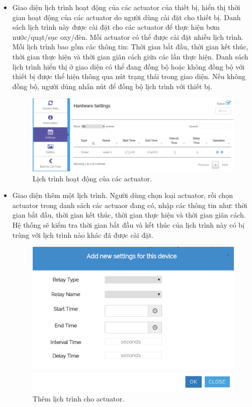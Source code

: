 \documentclass[a4paper,12pt,oneside]{article}
\begin{document}
\begin{itemize}
\item Giao diện lịch trình hoạt động của các actuator của thiết bị, hiển thị thời gian hoạt động của các actuator do người dùng cài đặt cho thiết bị. Danh sách lịch trình này được cài đặt cho các actuator để thực hiện bơm nước/quạt/sục oxy/đèn. Mỗi actuator có thể được cài đặt nhiều lịch trình. Mỗi lịch trình bao gồm các thông tin: Thời gian bắt đầu, thời gian kết thúc, thời gian thực hiện và thời gian giãn cách giữa các lần thực hiện. Danh sách lịch trình hiển thị ở giao diện có thể đang đồng bộ hoặc không đồng bộ với thiết bị được thể hiện thông qua nút trạng thái trong giao diện. Nếu không đồng bộ, người dùng nhấn nút để đồng bộ lịch trình với thiết bị. 
\begin{figure}[H]
\centering
\includegraphics[scale=.5]{hinh/web_schedule.png}
\caption{Lịch trình hoạt động của các actuator.}
\end{figure}

\item Giao diện thêm một lịch trình. Người dùng chọn loại actuator, rồi chọn actuator trong danh sách các actuaor đang có, nhập các thông tin như: thời gian bắt đầu, thời gian kết thúc, thời gian thực hiện và thời gian giãn cách. Hệ thống sẽ kiểm tra thời gian bắt đầu và kết thúc của lịch trình này có bị trùng với lịch trình nào khác đã được cài đặt.
\begin{figure}[H]
\centering
\includegraphics[scale=.5]{hinh/web_add_schedule.png}
\caption{Thêm lịch trình cho actuator.}
\end{figure}


\end{itemize}
\end{document}
